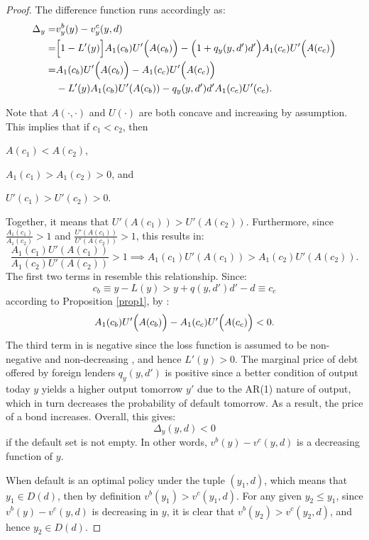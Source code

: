 \begin{proof}
    The difference function runs accordingly as:
    \begin{align}
        \Delta_y =& v^b_y(y) - v^c_y(y, d) \nonumber \\
        =& \Big[ 1 - L' (y)\Big] A_1 (c_b) U' \Bigl(A(c_b)\Bigr)-
            \Big(1 + q_y(y, d')d'\Big) A_1(c_c) U'\Big(A(c_c)\Big) \nonumber\\
        =& A_1 (c_b) U' \Bigl(A(c_b)\Bigr)-A_1 (c_c) U' \Bigl(A(c_c)\Bigr)  \nonumber \\
        & -L'(y) A_1(c_b)U'(A(c_b)) - q_y(y, d')d'A_1(c_c)U'(c_c). \label{eq:diff-value-function}
    \end{align}

    Note that $A(\cdot, \cdot)$ and $U(\cdot)$ are both concave and increasing by assumption. This implies that if $c_1<c_2$, then
    \begin{enumerate*}[label = (\roman*)]
        \item $A(c_1) < A(c_2)$,
        \item $A_1(c_1) > A_1(c_2)>0$, and
        \item $U'(c_1) > U'(c_2)>0$.
    \end{enumerate*}
    Together, it means that $U'(A(c_1)) > U'(A(c_2))$. Furthermore, since $\frac{A_1(c_1)}{A_1(c_2)} > 1$ and $\frac {U'(A(c_1))}{U'(A(c_2))} > 1$, this results in:
    \begin{equation}
        \label{eq:AUA-compare}
        \frac{A_1(c_1) U'(A(c_1))}{A_1(c_2) U'(A(c_2))} > 1 \implies
        {A_1(c_1) U'(A(c_1))} > {A_1(c_2) U'(A(c_2))}.
    \end{equation}
    The first two terms in  resemble this relationship. Since:
    \begin{equation*}
        c_b \equiv y - L(y) > y+q(y, d')d' -d \equiv c_c
    \end{equation*}
    according to Proposition \ref{prop1}, by :
    \begin{equation*}
        A_1 (c_b) U' \Bigl(A(c_b)\Bigr) - A_1 (c_c) U' \Bigl(A(c_c)\Bigr) < 0.
    \end{equation*}
    The third term in  is negative since the loss function is assumed to be non-negative and non-decreasing \citep{Na-18}, and hence $L'(y) > 0$. The marginal price of debt offered by foreign lenders $q_y(y, d')$ is positive since a better condition of output today $y$ yields a higher output tomorrow $y'$ due to the AR(1) nature of output, which in turn decreases the probability of default tomorrow. As a result, the price of a bond increases.
    Overall, this gives:
    \begin{equation*}
        \Delta_y (y, d) < 0
    \end{equation*}
    if the default set is not empty. In other words, $v^b(y) - v^c(y, d)$ is a decreasing function of $y$.

    When default is an optimal policy under the tuple $(y_1, d)$, which means that $y_1 \in D(d)$, then by definition $v^b(y_1) > v^c(y_1, d)$. For any given $y_2 \le y_1$, since $v^b(y) - v^c(y, d)$ is decreasing in $y$, it is clear that $v^b(y_2) > v^c(y_2, d)$, and hence $y_2 \in D(d)$.
\end{proof}

